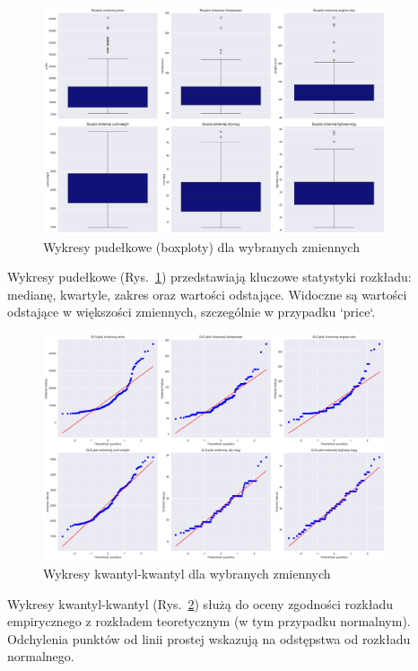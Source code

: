 \documentclass[12pt,a4paper]{article}
\begin{document}
\begin{figure}[H]
    \centering
    \includegraphics[width=0.9\textwidth]{figures/boxplots.png}
    \caption{Wykresy pudełkowe (boxploty) dla wybranych zmiennych}
    \label{fig:boxplots}
\end{figure}

Wykresy pudełkowe (Rys.~\ref{fig:boxplots}) przedstawiają kluczowe statystyki rozkładu: medianę, kwartyle, zakres oraz wartości odstające. Widoczne są wartości odstające w większości zmiennych, szczególnie w przypadku `price`.

\begin{figure}[H]
    \centering
    \includegraphics[width=0.9\textwidth]{figures/qq_plots.png}
    \caption{Wykresy kwantyl-kwantyl dla wybranych zmiennych}
    \label{fig:qq_plots}
\end{figure}

Wykresy kwantyl-kwantyl (Rys.~\ref{fig:qq_plots}) służą do oceny zgodności rozkładu empirycznego z rozkładem teoretycznym (w tym przypadku normalnym). Odchylenia punktów od linii prostej wskazują na odstępstwa od rozkładu normalnego.
\end{document}
